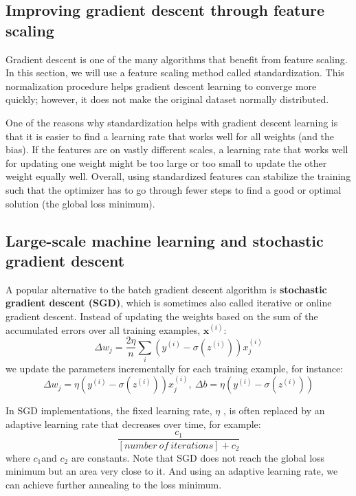 \subsection{Improving gradient descent through feature scaling}
Gradient descent is one of the many algorithms that benefit from feature scaling. In this section, we will use a feature scaling method called standardization. This normalization procedure helps gradient descent learning to converge more quickly; however, it does not make the original dataset normally distributed.

One of the reasons why standardization helps with gradient descent learning is that it is easier to find a learning rate that works well for all weights (and the bias). If the features are on vastly different scales, a learning rate that works well for updating one weight might be too large or too small to update the other weight equally well. Overall, using standardized features can stabilize the training such that the optimizer has to go through fewer steps to find a good or optimal solution (the global loss minimum).

\subsection{Large-scale machine learning and stochastic gradient descent}
A popular alternative to the batch gradient descent algorithm is \textbf{stochastic gradient descent (SGD)}, which is sometimes also called iterative or online gradient descent. Instead of updating the weights based on the sum of the accumulated errors over all training examples, $\textbf{x}^{(i)}$:
\begin{equation*}
    \Delta w_j=\frac{2\eta}{n}\sum_{i}\left(y^{(i)}-\sigma(z^{(i)})\right)x_j^{(i)}
\end{equation*}
we update the parameters incrementally for each training example, for instance:
\begin{equation*}
    \Delta w_j=\eta\left(y^{(i)}-\sigma(z^{(i)})\right)x_j^{(i)},~\Delta b=\eta\left(y^{(i)}-\sigma(z^{(i)})\right)
\end{equation*}

\begin{tcolorbox}[title=Adjusting the learning rate during training]
    In SGD implementations, the fixed learning rate, $\eta$ , is often replaced by an adaptive learning
    rate that decreases over time, for example:
    \begin{equation*}
        \frac{c_1}{[number~of~iterations]+c_2}
    \end{equation*}
    where $c_1$and $c_2$ are constants. Note that SGD does not reach the global loss minimum but an area very close to it. And using an adaptive learning rate, we can achieve further annealing to the loss minimum.
\end{tcolorbox}
